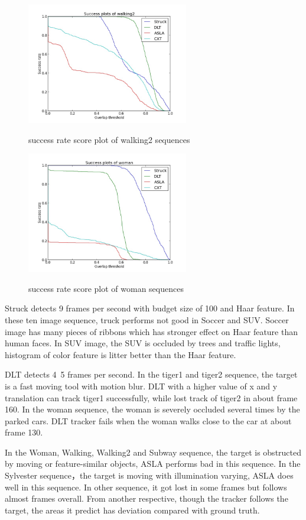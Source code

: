 \documentclass{acm_proc_article-sp}
\begin{document}
\begin{figure}[hbt]
    \includegraphics[width=200pt]{walking2.jpg}
    \label{fig:walking2}
    \caption{success rate score plot of walking2 sequences}
\end{figure}

\begin{figure}[hbt]
  \includegraphics[width=200pt]{woman.jpg}
  \label{fig:woman}
  \caption{success rate score plot of woman sequences}
\end{figure}

Struck detects 9 frames per second with budget size of 100 and Haar feature. In these ten image sequence, truck performs not good in Soccer and SUV. Soccer image has many pieces of ribbons which has stronger effect on Haar feature than human faces. In SUV image, the SUV is occluded by trees and traffic lights, histogram of color feature is litter better than the Haar feature.

DLT detects 4~5 frames per second. In the tiger1 and tiger2 sequence, the target is a fast moving tool with motion blur. DLT with a higher value of x and y translation can track tiger1 successfully, while lost track of tiger2 in about frame 160. In the woman sequence, the woman is severely occluded several times by the parked cars. DLT tracker fails when the woman walks close to the car at about frame 130.

In the Woman, Walking, Walking2 and Subway sequence, the target is obstructed by moving or feature-similar objects, ASLA performs bad in this sequence. In the Sylvester sequence，the target is moving with illumination varying, ASLA does well in this sequence. In other sequence, it got lost in some frames but follows almost frames overall. From another respective,  though the tracker follows the target, the areas it predict has deviation compared with ground truth.
\end{document}
